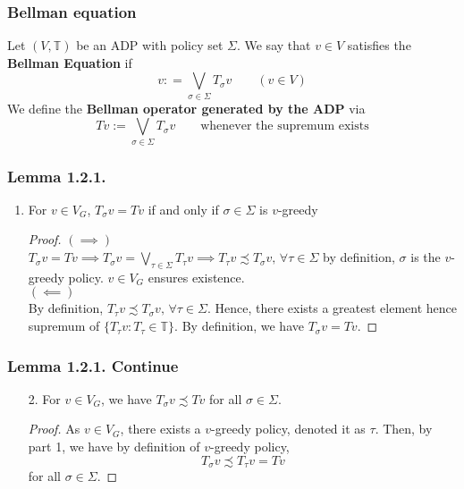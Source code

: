 \documentclass[11pt,xcolor={dvipsnames},hyperref={pdftex,pdfpagemode=UseNone,hidelinks,pdfdisplaydoctitle=true},usepdftitle=false]{beamer}
\begin{document}
\begin{frame}
\frametitle{Bellman equation}
\begin{definition}
Let $(V,\mathbb{T})$ be an ADP with policy set $\Sigma$. We say that $v\in V$ satisfies the \textbf{Bellman Equation} if
$$
v: = \bigvee_{\sigma\in\Sigma} T_\sigma v\qquad(v\in V)
$$
We define the \textbf{Bellman operator generated by the ADP} via
$$
Tv:= \bigvee_{\sigma\in\Sigma} T_\sigma v \qquad\text{whenever the supremum exists}
$$
\end{definition}
\end{frame}


\begin{frame}
\frametitle{Lemma 1.2.1.}
\begin{lemma}
\begin{enumerate}
\item For $v\in V_G$, $T_\sigma v = Tv$ if and only if $\sigma\in\Sigma$ is $v$-greedy 
\begin{proof}
$(\implies)$\\
$T_\sigma v = Tv\implies T_\sigma v  = \bigvee_{\tau\in\Sigma} T_\tau v\implies T_\tau v\precsim T_\sigma v,\, \forall \tau\in \Sigma$ by definition, $\sigma$ is the $v$-greedy policy. $v\in V_G$ ensures existence.\\
$(\impliedby)$\\
By definition, $T_\tau v\precsim T_\sigma v,\,\forall \tau\in \Sigma$. Hence, there exists a greatest element hence supremum of $\{T_\tau v: T_\tau\in \mathbb{T}\}$. By definition, we have $T_\sigma v= Tv$.
\end{proof}
\end{enumerate}
\end{lemma}
\end{frame}

\begin{frame}
\frametitle{Lemma 1.2.1. Continue}
\begin{lemma}
\begin{enumerate}
\item[2.]For  $v\in V_G$, we have $T_\sigma v\precsim Tv$ for all $\sigma\in \Sigma$.
\begin{proof}
As $v\in V_G$, there exists a $v$-greedy policy, denoted it as $\tau$. Then, by part 1, we have by definition of $v$-greedy policy,
$$
T_\sigma v\precsim T_\tau v = Tv
$$
for all $\sigma\in \Sigma$.
\end{proof}
\end{enumerate}
\end{lemma}
\end{frame}
\end{document}
